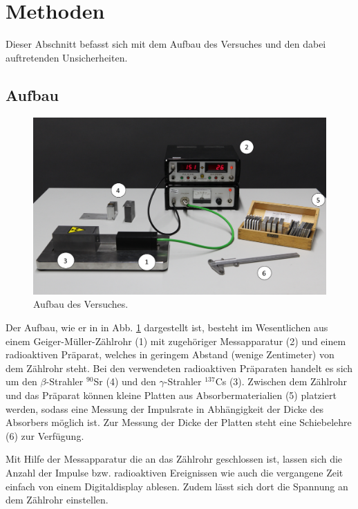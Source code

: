 \section{Methoden}
	
	Dieser Abschnitt befasst sich mit dem Aufbau des Versuches und den dabei auftretenden Unsicherheiten.
	
	\subsection{Aufbau}	
		
		\begin{figure}[ht]
			\centering
			\includegraphics[width=\textwidth]{Aufbau.png}
			\caption{Aufbau des Versuches. \cite{WWU}}
			\label{fig:Aufbau}	
		\end{figure}
		Der Aufbau, wie er in in Abb. \ref{fig:Aufbau} dargestellt ist, besteht im Wesentlichen aus einem Geiger-Müller-Zählrohr (1) mit zugehöriger Messapparatur (2) und einem radioaktiven Präparat, welches in geringem Abstand (wenige Zentimeter) von dem Zählrohr steht.
		Bei den verwendeten radioaktiven Präparaten handelt es sich um den $\beta$-Strahler $^{90}$Sr (4) und den $\gamma$-Strahler $^{137}$Cs (3).
		Zwischen dem Zählrohr und das Präparat können kleine Platten aus Absorbermaterialien (5) platziert werden, sodass eine Messung der Impulsrate in Abhängigkeit der Dicke des Absorbers möglich ist.
		Zur Messung der Dicke der Platten steht eine Schiebelehre (6) zur Verfügung.
		
		Mit Hilfe der Messapparatur die an das Zählrohr geschlossen ist, lassen sich die Anzahl der Impulse bzw. radioaktiven Ereignissen wie auch die vergangene Zeit einfach von einem Digitaldisplay ablesen.
		Zudem lässt sich dort die Spannung an dem Zählrohr einstellen.
		
